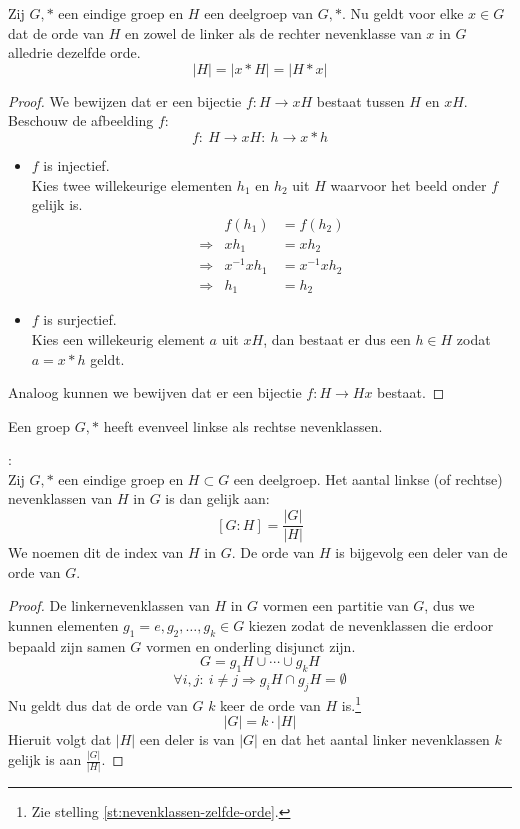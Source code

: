 \documentclass[main.tex]{subfiles}
\begin{document}
\begin{st}
  \label{st:nevenklassen-zelfde-orde}
  Zij $G,*$ een eindige groep en $H$ een deelgroep van $G,*$. Nu geldt voor elke $x\in G$ dat de orde van $H$ en zowel de linker als de rechter nevenklasse van $x$ in $G$ alledrie dezelfde orde.
  \[ |H| = |x*H| = |H*x| \]

  \begin{proof}
    We bewijzen dat er een bijectie $f: H \rightarrow xH$ bestaat tussen $H$ en $xH$.
    Beschouw de afbeelding $f$:
    \[ f:\ H\rightarrow xH:\ h \rightarrow x*h \]
    \begin{itemize}
    \item $f$ is injectief.\\
      Kies twee willekeurige elementen $h_{1}$ en $h_{2}$ uit $H$ waarvoor het beeld onder $f$ gelijk is.
      \[ 
      \begin{array}{rrl}
                  & f(h_{1})    &= f(h_{2})   \\ 
      \Rightarrow & xh_{1}      &= xh_{2}     \\
      \Rightarrow & x^{-1}xh_{1} &= x^{-1}xh_{2}\\
      \Rightarrow & h_{1}       &= h_{2}
      \end{array}
      \]
    \item $f$ is surjectief.\\
      Kies een willekeurig element $a$ uit $xH$, dan bestaat er dus een $h \in H$ zodat $a = x*h$ geldt.
    \end{itemize}
    Analoog kunnen we bewijven dat er een bijectie $f: H \rightarrow Hx$ bestaat.
  \end{proof}
\end{st}

\begin{st}
  Een groep $G,*$ heeft evenveel linkse als rechtse nevenklassen.

\end{st}

\begin{st}
  \label{st:stelling-van-lagrange}
  :\\
  Zij $G,*$ een eindige groep en $H \subset G$ een deelgroep. Het aantal linkse (of rechtse) nevenklassen van $H$ in $G$ is dan gelijk aan:
  \[ [G:H] = \frac{|G|}{|H|} \]
  We noemen dit de index van $H$ in $G$.
  De orde van $H$ is bijgevolg een deler van de orde van $G$.

  \begin{proof}
    De linkernevenklassen van $H$ in $G$ vormen een partitie van $G$, dus we kunnen elementen $g_{1} = e,g_{2},\dotsc,g_{k} \in G$ kiezen zodat de nevenklassen die erdoor bepaald zijn samen $G$ vormen en onderling disjunct zijn.
    \[ G = g_{1}H \cup \dotsb \cup g_{k}H \]
    \[ \forall i,j:\ i \neq j \Rightarrow g_{i}H \cap g_{j}H = \emptyset \]
    Nu geldt dus dat de orde van $G$ $k$ keer de orde van $H$ is.\footnote{Zie stelling \ref{st:nevenklassen-zelfde-orde}.}
    \[ |G| = k \cdot |H|\]
    Hieruit volgt dat $|H|$ een deler is van $|G|$ en dat het aantal linker nevenklassen $k$ gelijk is aan $\frac{|G|}{|H|}$.
  \end{proof}
\end{st}
\end{document}
